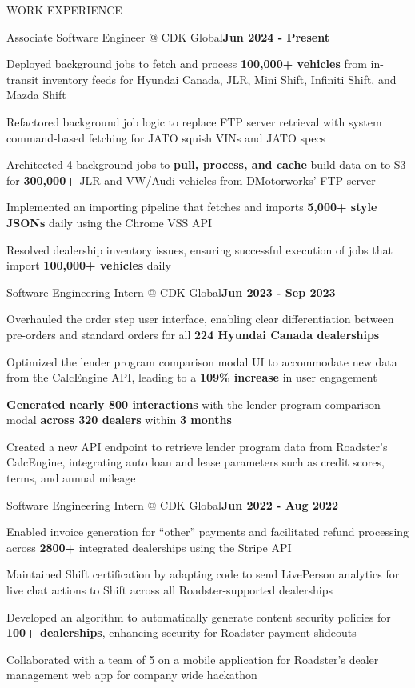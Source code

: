 \documentclass[]{resume}
\begin{document}
\begin{section}{WORK EXPERIENCE}
    \begin{subsection}{Associate Software Engineer @ CDK Global}{}{\textbf{Jun 2024 - Present}}{}
        \item Deployed background jobs to fetch and process \textbf{100,000+ vehicles} from in-transit inventory feeds for Hyundai Canada, JLR, Mini Shift, Infiniti Shift, and Mazda Shift
        \item Refactored background job logic to replace FTP server retrieval with system command-based fetching for JATO squish VINs and JATO specs
        \item Architected 4 background jobs to \textbf{pull, process, and cache} build data on to S3 for \textbf{300,000+} JLR and VW/Audi vehicles from DMotorworks' FTP server
        \item Implemented an importing pipeline that fetches and imports \textbf{5,000+ style JSONs} daily using the Chrome VSS API
        \item Resolved dealership inventory issues, ensuring successful execution of jobs that import \textbf{100,000+ vehicles} daily
    \end{subsection}
    \begin{subsection}{Software Engineering Intern @ CDK Global}{}{\textbf{Jun 2023 - Sep 2023}}{}
        \item Overhauled the order step user interface, enabling clear differentiation between pre-orders and standard orders for all \textbf{224 Hyundai Canada dealerships}
        \item Optimized the lender program comparison modal UI to accommodate new data from the CalcEngine API, leading to a \textbf{109\% increase} in user engagement
        \item \textbf{Generated nearly 800 interactions} with the lender program comparison modal \textbf{across 320 dealers} within \textbf{3 months}
        \item Created a new API endpoint to retrieve lender program data from Roadster's CalcEngine, integrating auto loan and lease parameters such as credit scores, terms, and annual mileage
    \end{subsection}
    \begin{subsection}{Software Engineering Intern @ CDK Global}{}{\textbf{Jun 2022 - Aug 2022}}{}
        \item Enabled invoice generation for “other” payments and facilitated refund processing across \textbf{2800+} integrated dealerships using the Stripe API
        \item Maintained Shift certification by adapting code to send LivePerson analytics for live chat actions to Shift across all Roadster-supported dealerships
        \item Developed an algorithm to automatically generate content security policies for \textbf{100+ dealerships}, enhancing security for Roadster payment slideouts
        \item Collaborated with a team of 5 on a mobile application for Roadster’s dealer management web app for company wide hackathon
    \end{subsection}
\end{section}
\end{document}

